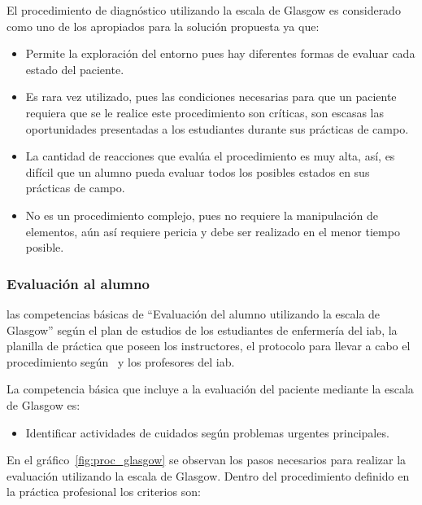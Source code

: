 El procedimiento de diagnóstico utilizando la escala de Glasgow es considerado
como uno de los apropiados para la solución propuesta ya que:

\begin{itemize}
\item Permite la exploración del entorno pues hay diferentes formas de evaluar cada
    estado del paciente.
\item Es rara vez utilizado, pues las condiciones necesarias para que un paciente 
    requiera que se le realice este procedimiento son críticas, son
    escasas las oportunidades presentadas a los estudiantes durante sus
    prácticas de campo. 
\item La cantidad de reacciones que evalúa el procedimiento es muy alta,
    así, es difícil que un alumno pueda evaluar todos los posibles estados en
    sus prácticas de campo.
\item No es un procedimiento complejo, pues no requiere la manipulación de
    elementos, aún así requiere pericia y debe ser realizado en el menor tiempo
    posible.
\end{itemize}


\subsubsection{Evaluación al alumno}

 las competencias básicas de \enquote{Evaluación
    del alumno utilizando la escala de Glasgow} según el plan de estudios de los
estudiantes de enfermería del \Gls{iab}, la planilla de práctica que poseen los
instructores, el protocolo para llevar a cabo el procedimiento
según~\cite{protocolo} y los profesores del \Gls{iab}.

La competencia básica que incluye a la evaluación del paciente mediante la
escala de Glasgow es:

\begin{itemize}
\item Identificar actividades de cuidados según problemas urgentes principales.
\end{itemize}

En el gráfico~\ref{fig:proc_glasgow} se observan los pasos necesarios para
realizar la evaluación utilizando la escala de Glasgow\cite{protocolo}. Dentro del
procedimiento definido en la práctica profesional los criterios son:

